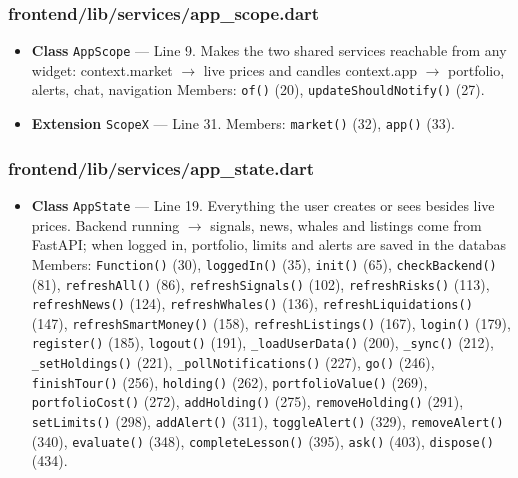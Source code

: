 \subsubsection*{frontend/lib/services/app\_scope.dart}
\begin{itemize}[nosep,leftmargin=1.5em]
\item \textbf{Class} \texttt{AppScope} --- Line 9. Makes the two shared services reachable from any widget: context.market  $\rightarrow$ live prices and candles context.app     $\rightarrow$ portfolio, alerts, chat, navigation Members: \texttt{of(\allowbreak{})} (20), \texttt{updateShouldNotify(\allowbreak{})} (27).
\item \textbf{Extension} \texttt{ScopeX} --- Line 31. Members: \texttt{market(\allowbreak{})} (32), \texttt{app(\allowbreak{})} (33).
\end{itemize}
\subsubsection*{frontend/lib/services/app\_state.dart}
\begin{itemize}[nosep,leftmargin=1.5em]
\item \textbf{Class} \texttt{AppState} --- Line 19. Everything the user creates or sees besides live prices. Backend running  $\rightarrow$ signals, news, whales and listings come from FastAPI; when logged in, portfolio, limits and alerts are saved in the databas Members: \texttt{Function(\allowbreak{})} (30), \texttt{loggedIn(\allowbreak{})} (35), \texttt{init(\allowbreak{})} (65), \texttt{checkBackend(\allowbreak{})} (81), \texttt{refreshAll(\allowbreak{})} (86), \texttt{refreshSignals(\allowbreak{})} (102), \texttt{refreshRisks(\allowbreak{})} (113), \texttt{refreshNews(\allowbreak{})} (124), \texttt{refreshWhales(\allowbreak{})} (136), \texttt{refreshLiquidations(\allowbreak{})} (147), \texttt{refreshSmartMoney(\allowbreak{})} (158), \texttt{refreshListings(\allowbreak{})} (167), \texttt{login(\allowbreak{})} (179), \texttt{register(\allowbreak{})} (185), \texttt{logout(\allowbreak{})} (191), \texttt{\_\allowbreak{}loadUserData(\allowbreak{})} (200), \texttt{\_\allowbreak{}sync(\allowbreak{})} (212), \texttt{\_\allowbreak{}setHoldings(\allowbreak{})} (221), \texttt{\_\allowbreak{}pollNotifications(\allowbreak{})} (227), \texttt{go(\allowbreak{})} (246), \texttt{finishTour(\allowbreak{})} (256), \texttt{holding(\allowbreak{})} (262), \texttt{portfolioValue(\allowbreak{})} (269), \texttt{portfolioCost(\allowbreak{})} (272), \texttt{addHolding(\allowbreak{})} (275), \texttt{removeHolding(\allowbreak{})} (291), \texttt{setLimits(\allowbreak{})} (298), \texttt{addAlert(\allowbreak{})} (311), \texttt{toggleAlert(\allowbreak{})} (329), \texttt{removeAlert(\allowbreak{})} (340), \texttt{evaluate(\allowbreak{})} (348), \texttt{completeLesson(\allowbreak{})} (395), \texttt{ask(\allowbreak{})} (403), \texttt{dispose(\allowbreak{})} (434).
\end{itemize}

